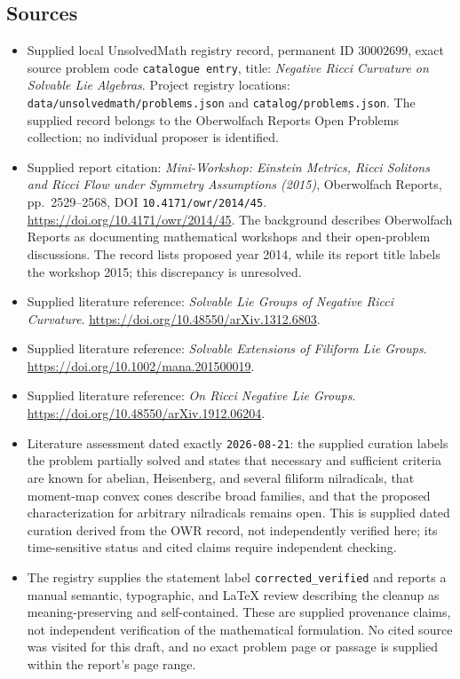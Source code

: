\documentclass[11pt]{article}
\begin{document}
\subsection{Sources}
\begin{itemize}
\item Supplied local UnsolvedMath registry record, permanent ID \(30002699\), exact source problem code \texttt{catalogue entry}, title: \emph{Negative Ricci Curvature on Solvable Lie Algebras}. Project registry locations: \texttt{data/unsolvedmath/problems.json} and \texttt{catalog/problems.json}. The supplied record belongs to the Oberwolfach Reports Open Problems collection; no individual proposer is identified.
\item Supplied report citation: \emph{Mini-Workshop: Einstein Metrics, Ricci Solitons and Ricci Flow under Symmetry Assumptions (2015)}, Oberwolfach Reports, pp.~2529--2568, DOI \texttt{10.4171/owr/2014/45}. \url{https://doi.org/10.4171/owr/2014/45}. The background describes Oberwolfach Reports as documenting mathematical workshops and their open-problem discussions. The record lists proposed year 2014, while its report title labels the workshop 2015; this discrepancy is unresolved.
\item Supplied literature reference: \emph{Solvable Lie Groups of Negative Ricci Curvature}. \url{https://doi.org/10.48550/arXiv.1312.6803}.
\item Supplied literature reference: \emph{Solvable Extensions of Filiform Lie Groups}. \url{https://doi.org/10.1002/mana.201500019}.
\item Supplied literature reference: \emph{On Ricci Negative Lie Groups}. \url{https://doi.org/10.48550/arXiv.1912.06204}.
\item Literature assessment dated exactly \texttt{2026-08-21}: the supplied curation labels the problem partially solved and states that necessary and sufficient criteria are known for abelian, Heisenberg, and several filiform nilradicals, that moment-map convex cones describe broad families, and that the proposed characterization for arbitrary nilradicals remains open. This is supplied dated curation derived from the OWR record, not independently verified here; its time-sensitive status and cited claims require independent checking.
\item The registry supplies the statement label \texttt{corrected\_verified} and reports a manual semantic, typographic, and LaTeX review describing the cleanup as meaning-preserving and self-contained. These are supplied provenance claims, not independent verification of the mathematical formulation. No cited source was visited for this draft, and no exact problem page or passage is supplied within the report's page range.
\end{itemize}
\end{document}
